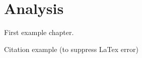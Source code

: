 \chapter{Analysis}

First example chapter.

Citation example (to suppress LaTex error) \cite{Andel07}
